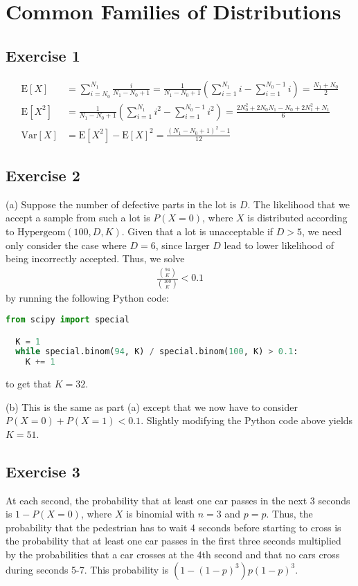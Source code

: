 \section{Common Families of Distributions}

\subsection{Exercise 1}
\begin{align*}
        \mathrm{E} [X] &= \sum_{i = N_0}^{N_1} \frac{i}{N_1 - N_0 + 1} = \frac{1}{N_1 - N_0 + 1} (\sum_{i = 1}^{N_1} i - \sum_{i = 1}^{N_0 - 1} i) = \frac{N_1 + N_0}{2} \\
        \mathrm{E} [X^2] &= \frac{1}{N_1 - N_0 + 1} (\sum_{i = 1}^{N_1} i^2 - \sum_{i = 1}^{N_0 - 1} i^2) = \frac{2N_0^2 + 2N_0N_1 - N_0 +2N_1^2 + N_1}{6} \\
        \mathrm{Var} [X] &= \mathrm{E} [X^2] - \mathrm{E} [X]^2 = \frac{(N_1 - N_0 + 1)^2 - 1}{12} 
\end{align*}

\subsection{Exercise 2}
(a) Suppose the number of defective parts in the lot is $D$. The likelihood that we accept a sample from such
a lot is $P(X = 0)$, where $X$ is distributed according to $\text{Hypergeom}(100, D, K)$. 
Given that a lot is unacceptable if $D > 5$, we need only consider the case where $D = 6$, since larger $D$ 
lead to lower likelihood of being incorrectly accepted. Thus, we solve
\begin{align*}
        \frac{\binom{94}{K}}{\binom{100}{K}} < 0.1 
\end{align*}
by running the following Python code:
\begin{lstlisting}[language=python]
  from scipy import special

  K = 1
  while special.binom(94, K) / special.binom(100, K) > 0.1:
    K += 1
\end{lstlisting}
to get that $K = 32$.

(b) This is the same as part (a) except that we now have to consider $P(X = 0) + P(X = 1) < 0.1$. Slightly
modifying the Python code above yields $K = 51$.

\subsection{Exercise 3}
At each second, the probability that at least one car passes in the next 3 seconds is $1 - P(X = 0)$, where
$X$ is binomial with $n = 3$ and $p = p$. Thus, the probability that the pedestrian has to wait 4 seconds
before starting to cross is the probability that at least one car passes in the first three seconds multiplied 
by the probabilities that a car crosses at the 4th second and that no cars cross during seconds 5-7. This
probability is $(1 - (1 - p)^3) p (1 - p)^3$.

